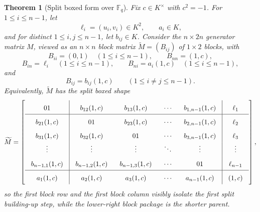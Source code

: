 \documentclass[12pt]{article}
\newtheorem{theorem}{Theorem}[section]
\newcommand{\F}{\mathbb{F}}
\begin{document}
\begin{theorem}[Split boxed form over \texorpdfstring{$\F_q$}{Fq}]
\label{thm:split-boxed-form}
Fix \(c\in K^\times\) with \(c^2=-1\). For \(1\le i\le n-1\), let
\[
\ell_i=(u_i,v_i)\in K^2,
\qquad
a_i\in K,
\]
and for distinct \(1\le i,j\le n-1\), let \(b_{ij}\in K\). Consider the \(n\times 2n\) generator matrix \(M\), viewed as an \(n\times n\) block matrix \(\widetilde M=(B_{ij})\) of \(1\times 2\) blocks, with
\[
B_{ii}=(0,1)\quad (1\le i\le n-1),\qquad B_{nn}=(1,c),
\]
\[
B_{in}=\ell_i \quad (1\le i\le n-1),\qquad
B_{ni}=a_i(1,c)\quad (1\le i\le n-1),
\]
and
\[
B_{ij}=b_{ij}(1,c)\qquad (1\le i\neq j\le n-1).
\]
Equivalently, \(\widetilde M\) has the split boxed shape
\[
\begingroup
\setlength{\arraycolsep}{9pt}
\renewcommand{\arraystretch}{1.72}
\widetilde M=
\left[
\begin{array}{c|cccc|c}
01 & b_{12}(1,c) & b_{13}(1,c) & \cdots & b_{1,n-1}(1,c) & \ell_1 \\
\hline
b_{21}(1,c) & 01 & b_{23}(1,c) & \cdots & b_{2,n-1}(1,c) & \ell_2 \\
b_{31}(1,c) & b_{32}(1,c) & 01 & \cdots & b_{3,n-1}(1,c) & \ell_3 \\
\vdots & \vdots & \vdots & \ddots & \vdots & \vdots \\
b_{n-1,1}(1,c) & b_{n-1,2}(1,c) & b_{n-1,3}(1,c) & \cdots & 01 & \ell_{n-1} \\
\hline
a_1(1,c) & a_2(1,c) & a_3(1,c) & \cdots & a_{n-1}(1,c) & (1,c)
\end{array}
\right],
\endgroup
\]
so the first block row and the first block column visibly isolate the first split building-up step, while the lower-right block package is the shorter parent.


\end{theorem}
\end{document}
